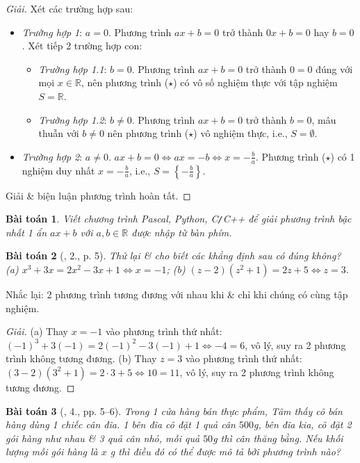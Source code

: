 \documentclass{article}
\newtheorem{baitoan}{Bài toán}
\begin{document}
\begin{proof}[Giải]
	Xét các trường hợp sau:
	\begin{itemize}
		\item \textit{Trường hợp 1}: $a = 0$. Phương trình $ax + b = 0$ trở thành $0x + b = 0$ hay $b = 0$. Xét tiếp 2 trường hợp con:
		\begin{itemize}
			\item \textit{Trường hợp 1.1}: $b = 0$. Phương trình $ax + b = 0$ trở thành $0 = 0$ đúng với mọi $x\in\mathbb{R}$, nên phương trình ($\star$) có vô số nghiệm thực với tập nghiệm $S = \mathbb{R}$.
			\item \textit{Trường hợp 1.2}: $b\ne0$. Phương trình $ax + b = 0$ trở thành $b = 0$, mâu thuẫn với $b\ne0$ nên phương trình ($\star$) vô nghiệm thực, i.e., $S = \emptyset$.
		\end{itemize}
		\item \textit{Trường hợp 2}: $a\ne0$. $ax + b = 0\Leftrightarrow ax = -b\Leftrightarrow x = -\frac{b}{a}$. Phương trình ($\star$) có 1 nghiệm duy nhất $x = -\frac{b}{a}$, i.e., $S = \left\{-\frac{b}{a}\right\}$.
	\end{itemize}
	Giải \& biện luận phương trình hoàn tất.
\end{proof}

\begin{baitoan}
	Viết chương trình Pascal, Python, C\emph{\texttt{/}}C++ để giải phương trình bậc nhất 1 ẩn $ax + b$ với $a,b\in\mathbb{R}$ được nhập từ bàn phím.
\end{baitoan}

\begin{baitoan}[\cite{SBT_Toan_8_tap_2}, 2., p. 5]
	Thử lại \& cho biết các khẳng định sau có đúng không? (a) $x^3 + 3x = 2x^2 - 3x + 1\Leftrightarrow x = -1$; (b) $(z - 2)(z^2 + 1) = 2z + 5\Leftrightarrow z = 3$.
\end{baitoan}
Nhắc lại: 2 phương trình tương đương với nhau khi \& chỉ khi chúng có cùng tập nghiệm.

\begin{proof}[Giải]
	(a) Thay $x = -1$ vào phương trình thứ nhất: $(-1)^3 + 3(-1) = 2(-1)^2 - 3(-1) + 1\Leftrightarrow-4 = 6$, vô lý, suy ra 2 phương trình không tương đương. (b) Thay $z = 3$ vào phương trình thứ nhất: $(3 - 2)(3^2 + 1) = 2\cdot3 + 5\Leftrightarrow10 = 11$, vô lý, suy ra 2 phương trình không tương đương.
\end{proof}

\begin{baitoan}[\cite{SBT_Toan_8_tap_2}, 4., pp. 5--6]
	Trong 1 cửa hàng bán thực phẩm, Tâm thấy cô bán hàng dùng 1 chiếc cân đĩa. 1 bên đĩa cô đặt 1 quả cân $500$\emph{g}, bên đĩa kia, cô đặt 2 gói hàng như nhau \& 3 quả cân nhỏ, mỗi quả $50$\emph{g} thì cân thăng bằng. Nếu khối lượng mỗi gói hàng là $x$ \emph{g} thì điều đó có thể được mô tả bởi phương trình nào?
\end{baitoan}
\end{document}
